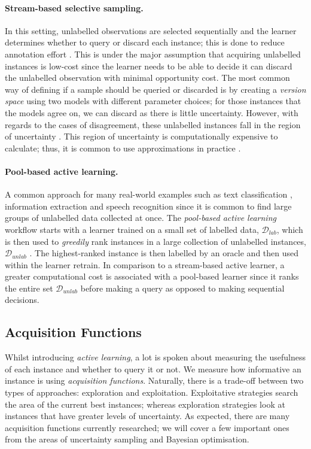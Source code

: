 \documentclass[ %
                    author={James Stephenson},
                supervisor={Dr. Edwin Simpson},
                    degree={MSc},
                     title={Project Plan: Bayesian Deep Learning For Extractive Test Summarisation},
                  subtitle={},
                      type={},
                      year={2022}]{../additions/dissertation}
\begin{document}
			\paragraph{Stream-based selective sampling.} In this setting, unlabelled observations are selected sequentially and the learner determines whether to query or discard each instance; this is done to reduce annotation effort \cite{Cohn94}. This is under the major assumption that acquiring unlabelled instances is low-cost since the learner needs to be able to decide it can discard the unlabelled observation with minimal opportunity cost. The most common way of defining if a sample should be queried or discarded is by creating a \emph{version space} \cite{Mitchell82} using two models with different parameter choices; for those instances that the models agree on, we can discard as there is little uncertainty. However, with regards to the cases of disagreement, these unlabelled instances fall in the region of uncertainty \cite{Settles09}. This region of uncertainty is computationally expensive to calculate; thus, it is common to use approximations in practice \cite{Seung92, Cohn94, Dasgupta07}.

			\paragraph{Pool-based active learning.} A common approach for many real-world examples such as text classification \cite{Lewis94}, information extraction \cite{Thompson99} and speech recognition \cite{Tur05} since it is common to find large groups of unlabelled data collected at once. The \emph{pool-based active learning} workflow starts with a learner trained on a small set of labelled data, $ \mathcal{D}_{lab} $, which is then used to \emph{greedily} rank instances in a large collection of unlabelled instances, $\mathcal{D}_{unlab} $ \cite{Lewis94}. The highest-ranked instance is then labelled by an oracle and then used within the learner retrain. In comparison to a stream-based active learner, a greater computational cost is associated with a pool-based learner since it ranks the entire set $\mathcal{D}_{unlab}$ before making a query as opposed to making sequential decisions.
	
		\subsection{Acquisition Functions}
		\label{chap:literaturereview:active:acquisition}
		
			Whilst introducing \emph{active learning}, a lot is spoken about measuring the usefulness of each instance and whether to query it or not. We measure how informative an instance is using \emph{acquisition functions}. Naturally, there is a trade-off between two types of approaches: exploration and exploitation. Exploitative strategies search the area of the current best instances; whereas exploration strategies look at instances that have greater levels of uncertainty. As expected, there are many acquisition functions currently researched; we will cover a few important ones from the areas of uncertainty sampling and Bayesian optimisation.
\end{document}
